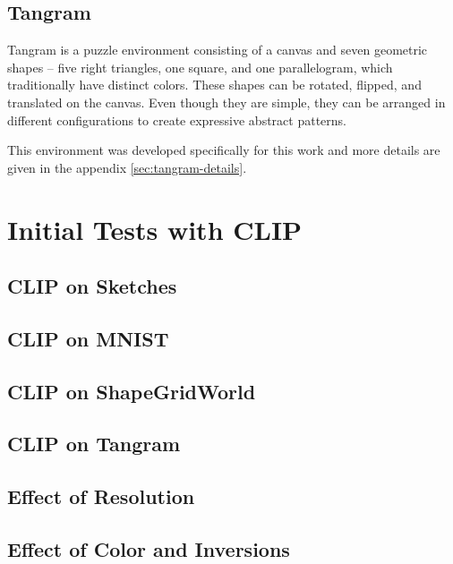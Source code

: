 \subsection{Tangram}
\label{sec:tangram}
Tangram is a puzzle environment consisting of a canvas and seven geometric shapes -- five right triangles, one square, and one parallelogram, which traditionally have distinct colors.
These shapes can be rotated, flipped, and translated on the canvas.
Even though they are simple, they can be arranged in different configurations to create expressive abstract patterns.

This environment was developed specifically for this work and more details are given in the appendix \ref{sec:tangram-details}.


\section{Initial Tests with CLIP}
\label{sec:clip-custom}


\subsection{CLIP on Sketches}
\label{sec:clip-sketches}


\subsection{CLIP on MNIST}
\label{sec:clip-mnist}


\subsection{CLIP on ShapeGridWorld}
\label{sec:clip-sgw}


\subsection{CLIP on Tangram}
\label{sec:clip-tangram}


\subsection{Effect of Resolution}
\label{sec:clip-resolution}


\subsection{Effect of Color and Inversions}
\label{sec:clip-color}


